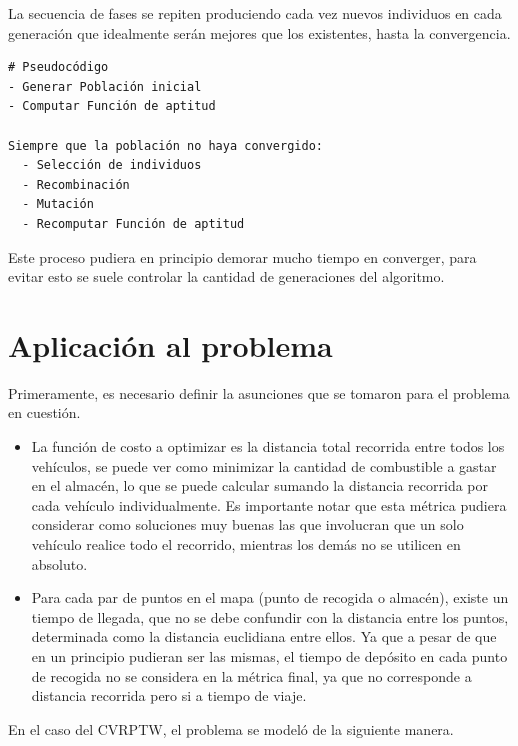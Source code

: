 \documentclass[12pt]{llncs}
\begin{document}
La secuencia de fases se repiten produciendo cada vez nuevos individuos en cada generación que idealmente serán mejores que los existentes, hasta la convergencia.

\begin{verbatim}
# Pseudocódigo
- Generar Población inicial
- Computar Función de aptitud

Siempre que la población no haya convergido:
  - Selección de individuos
  - Recombinación
  - Mutación
  - Recomputar Función de aptitud
\end{verbatim}

Este proceso pudiera en principio demorar mucho tiempo en converger, para evitar esto se suele controlar la cantidad de generaciones del algoritmo.

\section*{Aplicación al problema}

Primeramente, es necesario definir la asunciones que se tomaron para el problema en cuestión.

\begin{itemize}
    \item La función de costo a optimizar es la distancia total recorrida entre todos los vehículos, se puede ver como minimizar la cantidad de combustible a gastar en el almacén, lo que se puede calcular sumando la distancia recorrida por cada vehículo individualmente. Es importante notar que esta métrica pudiera considerar como soluciones muy buenas las que involucran que un solo vehículo realice todo el recorrido, mientras los demás no se utilicen en absoluto.
    
    \item Para cada par de puntos en el mapa (punto de recogida o almacén), existe un tiempo de llegada, que no se debe confundir con la distancia entre los puntos, determinada como la distancia euclidiana entre ellos. Ya que a pesar de que en un principio pudieran ser las mismas, el tiempo de depósito en cada punto de recogida no se considera en la métrica final, ya que no corresponde a distancia recorrida pero si a tiempo de viaje.
\end{itemize}

En el caso del CVRPTW, el problema se modeló de la siguiente manera.
\end{document}
